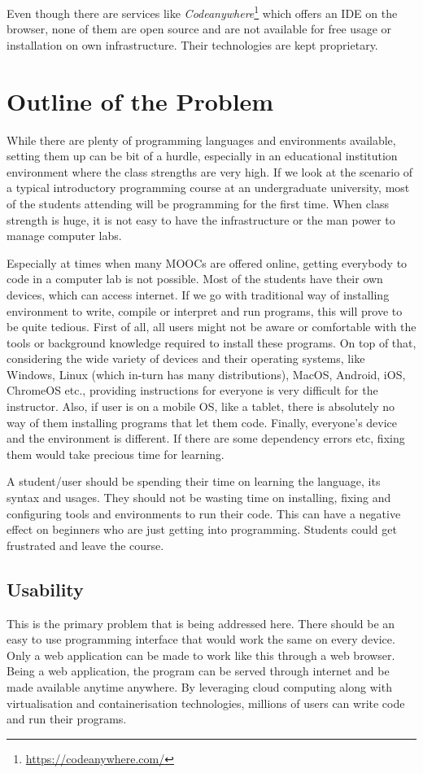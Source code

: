 \documentclass[DD]{iitmdiss}
\begin{document}
Even though there are services like \textit{Codeanywhere}\footnote{\url{https://codeanywhere.com/}} which offers an IDE on the browser, none of them are open source and are not available for free usage or installation on own infrastructure. Their technologies are kept proprietary.

\section{Outline of the Problem}

While there are plenty of programming languages and environments available, setting them up can be bit of a hurdle, especially in an educational institution environment where the class strengths are very high. If we look at the scenario of a typical introductory programming course at an undergraduate university, most of the students attending will be programming for the first time. When class strength is huge, it is not easy to have the infrastructure or the man power to manage computer labs. 

Especially at times when many MOOCs are offered online, getting everybody to code in a computer lab is not possible. Most of the students have their own devices, which can access internet. If we go with traditional way of installing environment to write, compile or interpret and run programs, this will prove to be quite tedious. First of all, all users might not be aware or comfortable with the tools or background knowledge required to install these programs. On top of that, considering the wide variety of devices and their operating systems, like Windows, Linux (which in-turn has many distributions), MacOS, Android, iOS, ChromeOS etc., providing instructions for everyone is very difficult for the instructor. Also, if user is on a mobile OS, like a tablet, there is absolutely no way of them installing programs that let them code. Finally, everyone's device and the environment is different. If there are some dependency errors etc, fixing them would take precious time for learning.

A student/user should be spending their time on learning the language, its syntax and usages. They should not be wasting time on installing, fixing and configuring tools and environments to run their code. This can have a negative effect on beginners who are just getting into programming. Students could get frustrated and leave the course.

\subsection{Usability}
This is the primary problem that is being addressed here. There should be an easy to use programming interface that would work the same on every device. Only a web application can be made to work like this through a web browser. Being a web application, the program can be served through internet and be made available anytime anywhere. By leveraging cloud computing along with virtualisation and containerisation technologies, millions of users can write code and run their programs.
\end{document}
